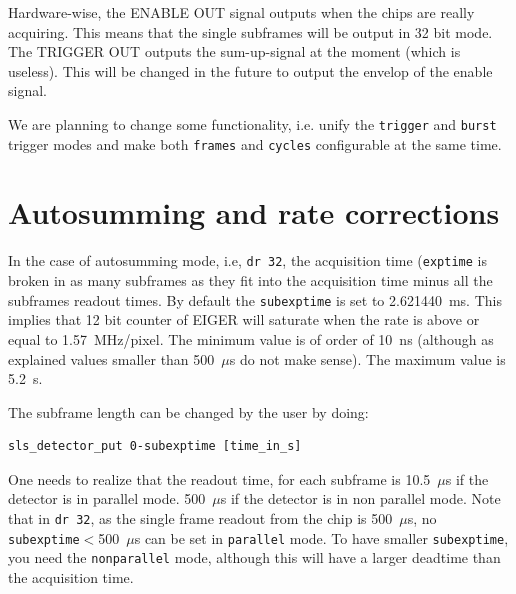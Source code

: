 \documentclass{article}
\newcommand{\E}{EIGER\xspace}
\begin{document}
Hardware-wise, the ENABLE OUT signal outputs when the chips are really acquiring. This means that the single subframes will be output in 32 bit mode. The TRIGGER OUT outputs the sum-up-signal at the moment (which is useless). This will be changed in the future to output the envelop of the enable signal. 

We are planning to change some functionality, i.e. unify the {\tt{trigger}} and {\tt{burst}} trigger modes and make both {\tt{frames}} and {\tt{cycles}} configurable at the same time.

\section{Autosumming and rate corrections}

In the case of autosumming mode, i.e, {\tt{dr 32}}, the acquisition time ({\tt{exptime}} is broken in as many subframes as they fit into the acquisition time minus all the subframes readout times. By default the {\tt{subexptime}} is set to 2.621440~ms. This implies that 12 bit counter of \E will saturate when the rate is above or equal to 1.57~MHz/pixel. The minimum value is of order of 10~ns (although as explained values smaller than 500~$\mu$s do not make sense). The maximum value is 5.2~s.

The subframe length can be changed by the user by doing: 
\begin{verbatim}
sls_detector_put 0-subexptime [time_in_s] 
\end{verbatim}

One needs to realize that the readout time, for each subframe is 10.5~$\mu$s if the detector is in parallel mode. 500~$\mu$s if the detector is in non parallel mode. Note that in {\tt{dr 32}}, as the single frame readout from the chip is 500~$\mu$s, no {\tt{subexptime}}$<$500~$\mu$s can be set in {\tt{parallel}} mode. To have smaller {\tt{subexptime}}, you need the {\tt{nonparallel}} mode, although this will have a larger deadtime than the acquisition time.\\
\end{document}
